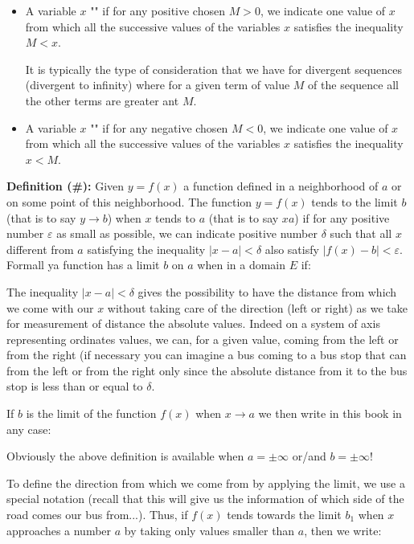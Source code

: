 	\begin{itemize}
		\item A variable $x$ "" if for any positive chosen $M>0$, we indicate one value of $x$ from which all the successive values of the variables $x$ satisfies the inequality $M<x$.
	
		It is typically the type of consideration that we have for divergent sequences (divergent to infinity) where for a given term of value $M$ of the sequence all the other terms are greater ant $M$.
		
		
		\item A variable $x$ "" if for any negative chosen $M<0$, we indicate one value of $x$ from which all the successive values of the variables $x$ satisfies the inequality $x<M$.
		
	\end{itemize}
	\textbf{Definition (\#\mydef):} Given $y=f(x)$ a function defined in a neighborhood of $a$ or on some point of this neighborhood. The function $y=f(x)$ tends to the limit $b$ (that is to say $y\rightarrow b$) when $x$ tends to $a$ (that is to say $x a$) if for any positive number $\varepsilon$ as small as possible, we can indicate  positive number $\delta$ such that all $x$ different from $a$ satisfying the inequality $|x-a|<\delta$ also satisfy $|f(x)-b|<\varepsilon$. Formall ya function has a limit $b$ on $a$ when in a domain $E$ if:
	
	The inequality $|x-a|<\delta$ gives the possibility to have the distance from which we come with our $x$ without taking care of the direction (left or right) as we take for measurement of distance the absolute values. Indeed on a system of axis representing ordinates values, we can, for a given value, coming from the left or from the right (if necessary you can imagine a bus coming to a bus stop that can from the left or from the right only since the absolute distance from it to the bus stop is less than or equal to $\delta$.
	
	If $b$ is the limit of the function $f (x)$ when $x\rightarrow a$ we then write in this book in any case:
	
	Obviously the above definition is available when $a=\pm \infty$ or/and $b=\pm \infty$!	
	
	To define the direction from which we come from by applying the limit, we use a special notation (recall that this will give us the information of which side of the road comes our bus from...). Thus, if $f (x)$ tends towards the limit $b_1$ when $x$ approaches a number $a$ by taking only values smaller than $a$, then we write:
	
